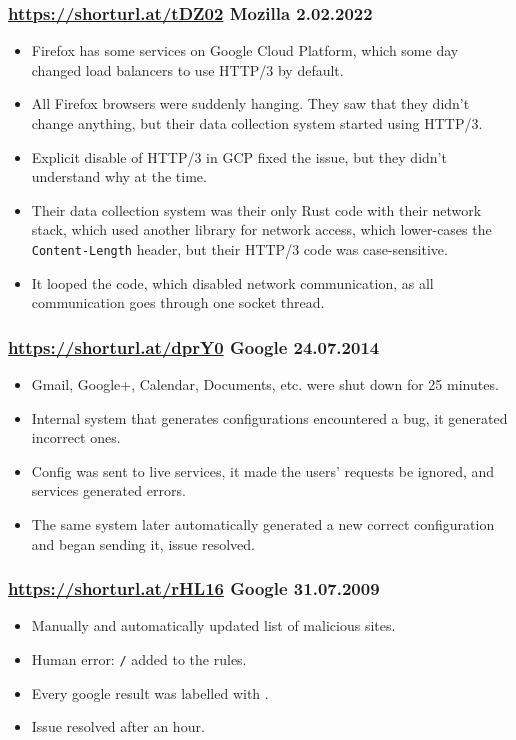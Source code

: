 \documentclass[handout]{beamer}
\begin{document}
\begin{frame}
	\frametitle{
		\href{https://shorturl.at/tDZ02}{https://shorturl.at/tDZ02}
		Mozilla
		2.02.2022
	}
	\begin{itemize}
		\item Firefox has some services on Google Cloud Platform, which some day changed load balancers to use HTTP/3 by default.\pause
		\item All Firefox browsers were suddenly hanging. They saw that they didn't change anything, but their data collection system started using HTTP/3.\pause
		\item Explicit disable of HTTP/3 in GCP fixed the issue, but they didn't understand why at the time.\pause
		\item Their data collection system was their only Rust code with their network stack, which used another library for network access, which lower-cases the \texttt{Content-Length} header, but their HTTP/3 code was case-sensitive.\pause
		\item It looped the code, which disabled network communication, as all communication goes through one socket thread.
	\end{itemize}
\end{frame}

\begin{frame}
	\frametitle{
		\href{https://shorturl.at/dprY0}{https://shorturl.at/dprY0}
		Google
		24.07.2014
	}
	\begin{itemize}
		\item Gmail, Google+, Calendar, Documents, etc. were shut down for 25 minutes. \pause
		\item Internal system that generates configurations encountered a bug, it generated incorrect ones. \pause
		\item Config was sent to live services, it made the users' requests be ignored, and services generated errors. \pause
		\item The same system later automatically generated a new correct configuration and began sending it, issue resolved.
	\end{itemize}
\end{frame}

\begin{frame}
	\frametitle{
		\href{https://shorturl.at/rHL16}{https://shorturl.at/rHL16}
		Google
		31.07.2009
	}
	\begin{itemize}
		\item Manually and automatically updated list of malicious sites. \pause
		\item Human error: \texttt{/} added to the rules. \pause
		\item Every google result was labelled with . \pause
		\item Issue resolved after an hour.
	\end{itemize}
\end{frame}
\end{document}
